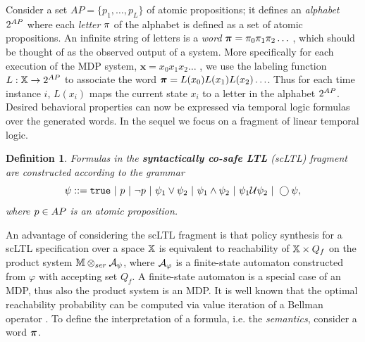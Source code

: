 \documentclass[conference]{IEEEtran}
\newtheorem{definition}{Definition}
\newcommand{\red}[1]{{\color{red} #1 }}
\newcommand{\sofieNew}[1]{{\color{blue}#1}}
\begin{document}
Consider a set $AP = \{ p_1, \ldots, p_L \}$ of atomic propositions; it defines an \emph{alphabet} ${2^{AP}}$ where each \emph{letter} $\pi$ of the alphabet is defined as a set of atomic propositions. An infinite string of letters is a \emph{word} $\boldsymbol{\pi}=\pi_0\pi_1\pi_2\ldots$%
, which should be thought of as the observed output of a system. 
\sofieNew{More specifically for each execution of the MDP system,  $\mathbf{x} = x_0 x_1 x_2 \ldots$ , we use the }
labeling function $L: \mathbb{X} \rightarrow {2^{AP}}$ to 
associate the word $\boldsymbol{\pi} = L(x_0)L(x_1) L(x_2) \ldots$. Thus for each time instance $i$, $L(x_i)$ maps the current state $x_i$ to a letter in the alphabet ${2^{AP}}$.
\sofieNew{Desired behavioral properties can now be expressed via temporal logic formulas over the generated words.}
In the sequel we focus on a fragment of linear temporal logic. 
\begin{definition}
  \label{def:gdtl-syntax}
  Formulas in the \textbf{syntactically co-safe LTL} (scLTL) fragment are constructed according to the grammar
  \begin{equation*}
    \label{eq:scLTL}
    \psi ::=  \True \ |\ p \ |\ \lnot p \ |\ \psi_1 \vee\psi_2  \ |\ \psi_1 \land \psi_2 \ |\ \psi_1 \ltluntil \psi_2 \ |\ \ltlnext \psi,
  \end{equation*}
  where $p\in AP$ is an atomic proposition.
\end{definition}
An advantage of considering the scLTL fragment is that policy synthesis for a scLTL specification over a space $\mathbb{X}$ is equivalent to reachability of $\mathbb{X}\times Q_f$ on the product system $\mathbb{M} \otimes_{ser} \mathcal{A}_\psi$, where $\mathcal{A}_\varphi$ is a finite-state automaton constructed from $\varphi$ \cite{Belta2017} with accepting set $Q_f$. A finite-state automaton is a special case of an MDP, thus also the product system is an MDP. It is well known that the optimal reachability probability can be computed via value iteration of a Bellman operator \cite{Baier2008}. To define the interpretation of a formula, i.e. the \emph{semantics}, consider a word $\boldsymbol{\pi}$.
\end{document}
